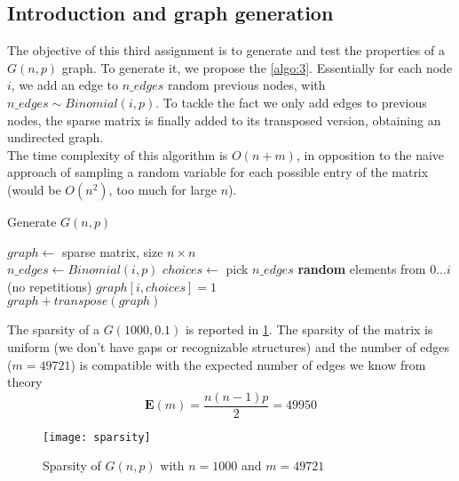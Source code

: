 \graphicspath{{../assignment3/figures/}}

\subsection{Introduction and graph generation}

The objective of this third assignment is to generate and test the properties of a $G(n,p)$ graph. To generate it, we propose the \cref{algo:3}. Essentially for each node $i$, we add an edge to $n\_edges$ random previous nodes, with $n\_edges \sim Binomial(i, p)$. To tackle the fact we only add edges to previous nodes, the sparse matrix is finally added to its transposed version, obtaining an undirected graph.\\
The time complexity of this algorithm is $O(n+m)$, in opposition to the naive approach of sampling a random variable for each possible entry of the matrix (would be $O(n^2)$, too much for large $n$).

\begin{algorithm}[!ht]
	\caption{Generate $G(n,p)$}
	\label{algo:3}
	\begin{algorithmic}[1]
		\State $graph \gets$ sparse matrix, size $n\times n$
		\\
		\State $n\_edges \gets Binomial(i, p)$ 
		\State $choices \gets $ pick $n\_edges$ \textbf{random} elements from $0...i$ (no repetitions)
		\State $graph[i, choices]=1$
		\EndIf
		\EndFor
		\\	
		\State \Return $graph+transpose(graph)$
		\EndFunction
	\end{algorithmic}
\end{algorithm}

The sparsity of a $G(1000,0.1)$ is reported in \cref{fig:3_sparsity}. The sparsity of the matrix is uniform (we don't have gaps or recognizable structures) and the number of edges ($m = 49721$) is compatible with the expected number of edges we know from theory
\begin{equation}
\mathbf{E} (m)=\frac{n(n-1)p}{2}=49950
\end{equation}

\begin{figure} [!ht]
	\centering
	\texttt{[image: sparsity]}
	\caption{Sparsity of $G(n,p)$ with $n = 1000$ and $m = 49721$}
	\label{fig:3_sparsity}
\end{figure}


